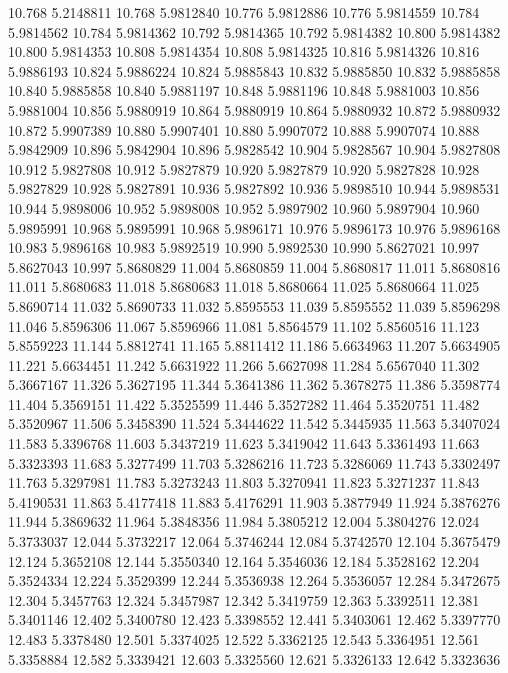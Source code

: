 10.768 5.2148811
10.768 5.9812840
10.776 5.9812886
10.776 5.9814559
10.784 5.9814562
10.784 5.9814362
10.792 5.9814365
10.792 5.9814382
10.800 5.9814382
10.800 5.9814353
10.808 5.9814354
10.808 5.9814325
10.816 5.9814326
10.816 5.9886193
10.824 5.9886224
10.824 5.9885843
10.832 5.9885850
10.832 5.9885858
10.840 5.9885858
10.840 5.9881197
10.848 5.9881196
10.848 5.9881003
10.856 5.9881004
10.856 5.9880919
10.864 5.9880919
10.864 5.9880932
10.872 5.9880932
10.872 5.9907389
10.880 5.9907401
10.880 5.9907072
10.888 5.9907074
10.888 5.9842909
10.896 5.9842904
10.896 5.9828542
10.904 5.9828567
10.904 5.9827808
10.912 5.9827808
10.912 5.9827879
10.920 5.9827879
10.920 5.9827828
10.928 5.9827829
10.928 5.9827891
10.936 5.9827892
10.936 5.9898510
10.944 5.9898531
10.944 5.9898006
10.952 5.9898008
10.952 5.9897902
10.960 5.9897904
10.960 5.9895991
10.968 5.9895991
10.968 5.9896171
10.976 5.9896173
10.976 5.9896168
10.983 5.9896168
10.983 5.9892519
10.990 5.9892530
10.990 5.8627021
10.997 5.8627043
10.997 5.8680829
11.004 5.8680859
11.004 5.8680817
11.011 5.8680816
11.011 5.8680683
11.018 5.8680683
11.018 5.8680664
11.025 5.8680664
11.025 5.8690714
11.032 5.8690733
11.032 5.8595553
11.039 5.8595552
11.039 5.8596298
11.046 5.8596306
11.067 5.8596966
11.081 5.8564579
11.102 5.8560516
11.123 5.8559223
11.144 5.8812741
11.165 5.8811412
11.186 5.6634963
11.207 5.6634905
11.221 5.6634451
11.242 5.6631922
11.266 5.6627098
11.284 5.6567040
11.302 5.3667167
11.326 5.3627195
11.344 5.3641386
11.362 5.3678275
11.386 5.3598774
11.404 5.3569151
11.422 5.3525599
11.446 5.3527282
11.464 5.3520751
11.482 5.3520967
11.506 5.3458390
11.524 5.3444622
11.542 5.3445935
11.563 5.3407024
11.583 5.3396768
11.603 5.3437219
11.623 5.3419042
11.643 5.3361493
11.663 5.3323393
11.683 5.3277499
11.703 5.3286216
11.723 5.3286069
11.743 5.3302497
11.763 5.3297981
11.783 5.3273243
11.803 5.3270941
11.823 5.3271237
11.843 5.4190531
11.863 5.4177418
11.883 5.4176291
11.903 5.3877949
11.924 5.3876276
11.944 5.3869632
11.964 5.3848356
11.984 5.3805212
12.004 5.3804276
12.024 5.3733037
12.044 5.3732217
12.064 5.3746244
12.084 5.3742570
12.104 5.3675479
12.124 5.3652108
12.144 5.3550340
12.164 5.3546036
12.184 5.3528162
12.204 5.3524334
12.224 5.3529399
12.244 5.3536938
12.264 5.3536057
12.284 5.3472675
12.304 5.3457763
12.324 5.3457987
12.342 5.3419759
12.363 5.3392511
12.381 5.3401146
12.402 5.3400780
12.423 5.3398552
12.441 5.3403061
12.462 5.3397770
12.483 5.3378480
12.501 5.3374025
12.522 5.3362125
12.543 5.3364951
12.561 5.3358884
12.582 5.3339421
12.603 5.3325560
12.621 5.3326133
12.642 5.3323636
